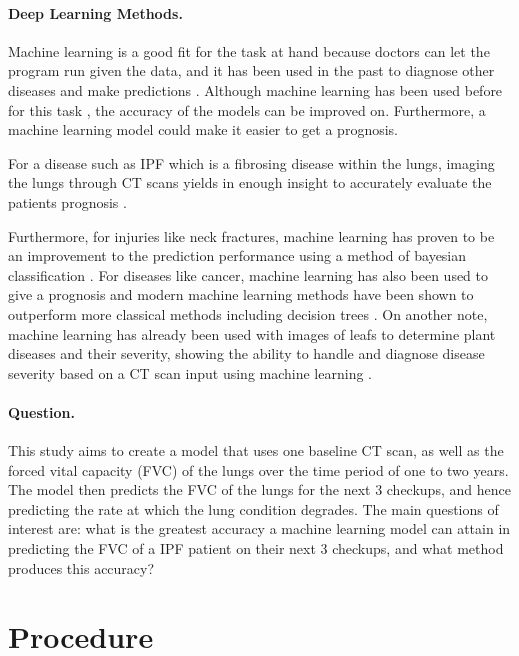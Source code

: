 \documentclass[12pt]{article}
\begin{document}
\paragraph*{Deep Learning Methods.}

Machine learning is a good fit for the task at hand because doctors can let the program run given the data, and it has been used in the past to diagnose other diseases and make predictions \cite{wang2010high}. 
Although machine learning has been used before for this task \cite{robbie2017evaluating,du20146,maldonado2014automated}, the accuracy of the models can be improved on.
Furthermore, a machine learning model could make it easier to get a prognosis.

For a disease such as IPF which is a fibrosing disease within the lungs, imaging the lungs through CT scans yields in enough insight to accurately evaluate the patients prognosis \cite{walsh2018role}.

Furthermore, for injuries like neck fractures, machine learning has proven to be an improvement to the prediction performance using a method of bayesian classification \cite{kukar1996machine}.
For diseases like cancer, machine learning has also been used to give a prognosis and modern machine learning methods have been shown to outperform more classical methods including decision trees \cite{cruz2006applications}.
On another note, machine learning has already been used with images of leafs to determine plant diseases and their severity, showing the ability to handle and diagnose disease severity based on a CT scan input using machine learning \cite{mwebaze2016machine}.

\paragraph*{Question.}

This study aims to create a model that uses one baseline CT scan, as well as the forced vital capacity (FVC) of the lungs over the time period of one to two years.
The model then predicts the FVC of the lungs for the next 3 checkups, and hence predicting the rate at which the lung condition degrades. 
The main questions of interest are: what is the greatest accuracy a machine learning model can attain in predicting the FVC of a IPF patient on their next 3 checkups, and what method produces this accuracy? 

\section*{Procedure}
\end{document}
